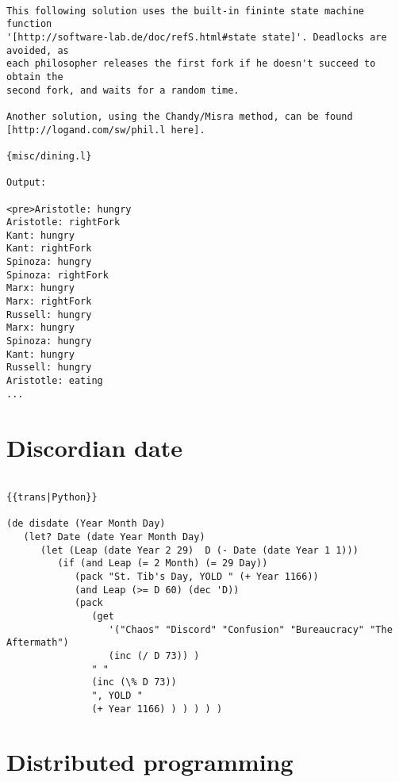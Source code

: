 \begin{verbatim}

This following solution uses the built-in fininte state machine function
'[http://software-lab.de/doc/refS.html#state state]'. Deadlocks are avoided, as
each philosopher releases the first fork if he doesn't succeed to obtain the
second fork, and waits for a random time.

Another solution, using the Chandy/Misra method, can be found
[http://logand.com/sw/phil.l here].

{misc/dining.l}

Output:

<pre>Aristotle: hungry
Aristotle: rightFork
Kant: hungry
Kant: rightFork
Spinoza: hungry
Spinoza: rightFork
Marx: hungry
Marx: rightFork
Russell: hungry
Marx: hungry
Spinoza: hungry
Kant: hungry
Russell: hungry
Aristotle: eating
...

\end{verbatim}

\section*{Discordian date}

\begin{verbatim}

{{trans|Python}}

(de disdate (Year Month Day)
   (let? Date (date Year Month Day)
      (let (Leap (date Year 2 29)  D (- Date (date Year 1 1)))
         (if (and Leap (= 2 Month) (= 29 Day))
            (pack "St. Tib's Day, YOLD " (+ Year 1166))
            (and Leap (>= D 60) (dec 'D))
            (pack
               (get
                  '("Chaos" "Discord" "Confusion" "Bureaucracy" "The Aftermath")
                  (inc (/ D 73)) )
               " "
               (inc (\% D 73))
               ", YOLD "
               (+ Year 1166) ) ) ) ) )

\end{verbatim}

\section*{Distributed programming}

